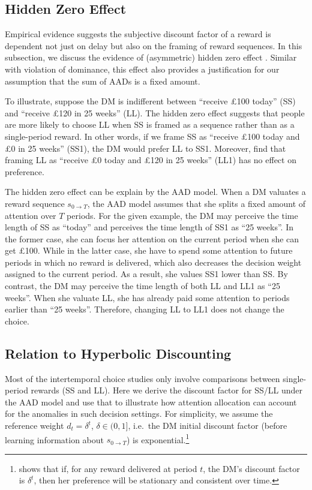\documentclass[
  12pt,
]{article}
\begin{document}
\hypertarget{hidden-zero-effect}{%
\subsection{Hidden Zero Effect}\label{hidden-zero-effect}}

Empirical evidence suggests the subjective discount factor of a reward
is dependent not just on delay but also on the framing of reward
sequences. In this subsection, we discuss the evidence of (asymmetric)
hidden zero effect
\citep{magen2008hidden, radu2011mechanism, read2017value}. Similar with
violation of dominance, this effect also provides a justification for
our assumption that the sum of AADs is a fixed amount.

To illustrate, suppose the DM is indifferent between ``receive £100
today'' (SS) and ``receive £120 in 25 weeks'' (LL). The hidden zero
effect suggests that people are more likely to choose LL when SS is
framed as a sequence rather than as a single-period reward. In other
words, if we frame SS as ``receive £100 today and £0 in 25 weeks''
(SS1), the DM would prefer LL to SS1. Moreover, \citet{read2017value}
find that framing LL as ``receive £0 today and £120 in 25 weeks'' (LL1)
has no effect on preference.

The hidden zero effect can be explain by the AAD model. When a DM
valuates a reward sequence \(s_{0\rightarrow T}\), the AAD model assumes
that she splits a fixed amount of attention over \(T\) periods. For the
given example, the DM may perceive the time length of SS as ``today''
and perceives the time length of SS1 as ``25 weeks''. In the former
case, she can focus her attention on the current period when she can get
£100. While in the latter case, she have to spend some attention to
future periods in which no reward is delivered, which also decreases the
decision weight assigned to the current period. As a result, she values
SS1 lower than SS. By contrast, the DM may perceive the time length of
both LL and LL1 as ``25 weeks''. When she valuate LL, she has already
paid some attention to periods earlier than ``25 weeks''. Therefore,
changing LL to LL1 does not change the choice.

\hypertarget{relation-to-hyperbolic-discounting}{%
\subsection{Relation to Hyperbolic
Discounting}\label{relation-to-hyperbolic-discounting}}

Most of the intertemporal choice studies only involve comparisons
between single-period rewards (SS and LL). Here we derive the discount
factor for SS/LL under the AAD model and use that to illustrate how
attention allocation can account for the anomalies in such decision
settings. For simplicity, we assume the reference weight
\(d_t = \delta^t\), \(\delta\in(0,1]\), i.e.~the DM initial discount
factor (before learning information about \(s_{0\rightarrow T}\)) is
exponential.\footnote{\citet{strotz1955myopia} shows that if, for any
  reward delivered at period \(t\), the DM's discount factor is
  \(\delta^t\), then her preference will be stationary and consistent
  over time.}
\end{document}
